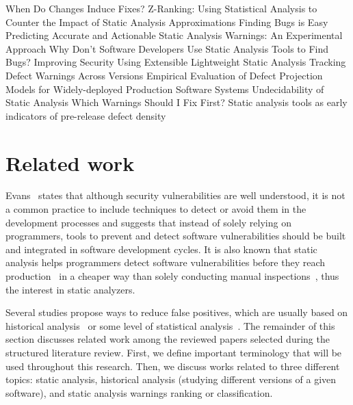 When Do Changes Induce Fixes?
Z-Ranking: Using Statistical Analysis to Counter the Impact of Static Analysis Approximations
Finding Bugs is Easy
Predicting Accurate and Actionable Static Analysis Warnings: An Experimental Approach
Why Don’t Software Developers Use Static Analysis Tools to Find Bugs?
Improving Security Using Extensible Lightweight Static Analysis
Tracking Defect Warnings Across Versions
Empirical Evaluation of Defect Projection Models for Widely-deployed Production Software Systems
Undecidability of Static Analysis
Which Warnings Should I Fix First?
Static analysis tools as early indicators of pre-release defect density~\cite{} \\




\section{Related work}
\label{sec:related_work}

Evans~\cite{evans_improving_2002} states that although security vulnerabilities
are well understood, it is not a common practice to include techniques to detect
or avoid them in the development processes and suggests that instead of solely
relying on programmers, tools to prevent and detect software vulnerabilities
should be built and integrated in software development cycles. It is also
known that static analysis helps programmers detect software vulnerabilities
before they reach production~\cite{evans_improving_2002} in a cheaper way than
solely conducting manual inspections~\cite{johnson_why_2013}, thus the interest
in static analyzers.

Several studies propose ways to reduce false positives, which are usually based
on historical analysis~\cite{penta_evolution_2008, spacco_tracking_2006,
kim_which_2007} or some level of statistical analysis~\cite{muske2013review,
boogerd2006prioritizing, kremenek2003z, ruthruff_predicting_2008}. The
remainder of this section discusses related work among the reviewed papers
selected during the structured literature review. First, we define important terminology
that will be used throughout this research. Then, we discuss works related to
three different topics: static analysis, historical analysis (studying
different versions of a given software), and static analysis warnings ranking
or classification.

